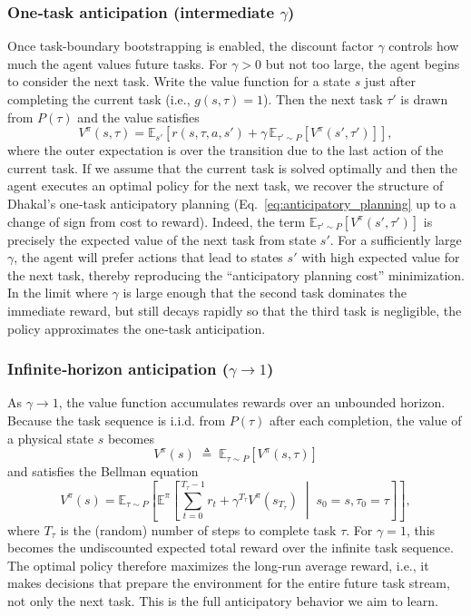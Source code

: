 \documentclass[10pt]{article} %
\begin{document}
\subsubsection*{One‑task anticipation (intermediate $\gamma$)}
Once task-boundary bootstrapping is enabled, the discount factor $\gamma$ controls how much the agent values future tasks. For $\gamma > 0$ but not too large, the agent begins to consider the next task.  
Write the value function for a state $s$ just after completing the current task (i.e., $g(s,\tau)=1$). Then the next task $\tau'$ is drawn from $P(\tau)$ and the value satisfies
\[
V^{\pi}(s,\tau) = \mathbb{E}_{s'}\!\left[ r(s,\tau,a,s') + \gamma\, \mathbb{E}_{\tau'\sim P}\!\left[ V^{\pi}(s',\tau') \right] \right],
\]
where the outer expectation is over the transition due to the last action of the current task.  
If we assume that the current task is solved optimally and then the agent executes an optimal policy for the next task, we recover the structure of Dhakal’s one‑task anticipatory planning (Eq.~\eqref{eq:anticipatory_planning} up to a change of sign from cost to reward).  
Indeed, the term $\mathbb{E}_{\tau'\sim P}[V^{\pi}(s',\tau')]$ is precisely the expected value of the next task from state $s'$.  
For a sufficiently large $\gamma$, the agent will prefer actions that lead to states $s'$ with high expected value for the next task, thereby reproducing the “anticipatory planning cost” minimization.  
In the limit where $\gamma$ is large enough that the second task dominates the immediate reward, but still decays rapidly so that the third task is negligible, the policy approximates the one‑task anticipation.

\subsubsection*{Infinite‑horizon anticipation ($\gamma \to 1$)}
As $\gamma \to 1$, the value function accumulates rewards over an unbounded horizon.  
Because the task sequence is i.i.d. from $P(\tau)$ after each completion, the value of a physical state $s$ becomes
\[
V^{\pi}(s) \;\triangleq\; \mathbb{E}_{\tau\sim P}\!\left[ V^{\pi}(s,\tau) \right]
\]
and satisfies the Bellman equation
\[
V^{\pi}(s) = \mathbb{E}_{\tau\sim P}\!\left[ \mathbb{E}^{\pi}\!\left[ \sum_{t=0}^{T_\tau-1} r_t + \gamma^{T_\tau} V^{\pi}(s_{T_\tau}) \;\middle|\; s_0=s,\tau_0=\tau \right] \right],
\]
where $T_\tau$ is the (random) number of steps to complete task $\tau$.  
For $\gamma=1$, this becomes the undiscounted expected total reward over the infinite task sequence.  
The optimal policy therefore maximizes the long‑run average reward, i.e., it makes decisions that prepare the environment for the entire future task stream, not only the next task.  
This is the full anticipatory behavior we aim to learn.
\end{document}
